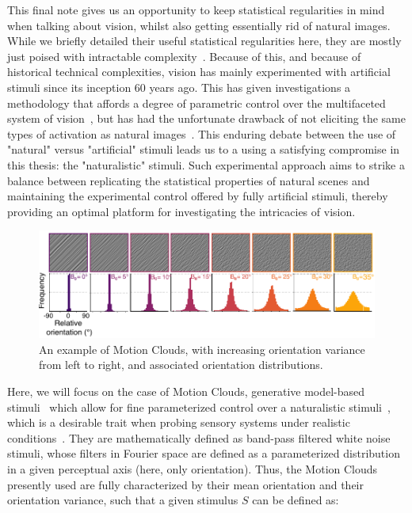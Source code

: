 This final note gives us an opportunity to keep statistical regularities in mind when talking about vision, whilst also getting essentially rid of natural images. While we briefly detailed their useful statistical regularities here, they are mostly just poised with intractable complexity~\cite{gauvrit2014natural, rust2005praise}. Because of this, and because of historical technical complexities, vision has mainly experimented with artificial stimuli since its inception $60$ years ago. This has given investigations a methodology that affords a degree of parametric control over the multifaceted system of vision~\cite{priebe2016mechanisms}, but has had the unfortunate drawback of not eliciting the same types of activation as natural images~\cite{fiser2004small, yoshida2020natural, baudot2013animation}. 
This enduring debate between the use of "natural" versus "artificial" stimuli leads us to a using a satisfying compromise in this thesis: the "naturalistic" stimuli. Such experimental approach aims to strike a balance between replicating the statistical properties of natural scenes and maintaining the experimental control offered by fully artificial stimuli, thereby providing an optimal platform for investigating the intricacies of vision.

\begin{figure}[h!tbp]
\vspace{0.25cm}
\centering
\includegraphics[width=.9\textwidth]{fig/chap2_fig_motionclouds.pdf}
\caption[An example of Motion Clouds.]{An example of Motion Clouds, with increasing orientation variance from left to right, and associated orientation distributions.}
\label{fig_chap2_stats_mc}
\end{figure}

Here, we will focus on the case of Motion Clouds, generative model-based stimuli~\cite{leon2012motion} which allow for fine parameterized control over a naturalistic stimuli~\cite{vacher2015biologically}, which is a desirable trait when probing sensory systems under realistic conditions~\cite{rust2005praise}. They are mathematically defined as band-pass filtered white noise stimuli, whose filters in Fourier space are defined as a parameterized distribution in a given perceptual axis (here, only orientation). 
Thus, the Motion Clouds presently used are fully characterized by their mean orientation and their orientation variance, such that a given stimulus $S$ can be defined as:

